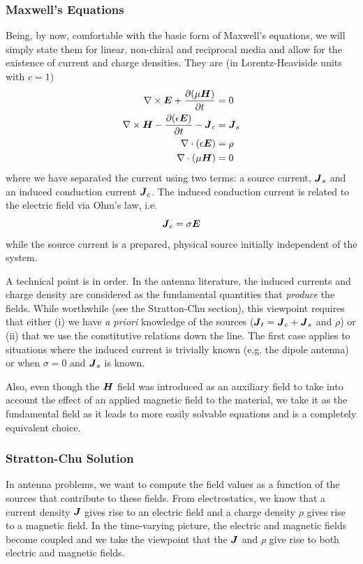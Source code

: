 \subsubsection{Maxwell's Equations}
Being, by now, comfortable with the basic form of Maxwell's equations, 
we will simply state them for linear, non-chiral and reciprocal media
and allow for the existence of current and charge densities. 
They are (in Lorentz-Heaviside units with $c=1$) \cite{NOV2012}
  \begin{subequations}
  \begin{align}
   \nabla\times\boldsymbol{E}+\frac{\partial(\mu\boldsymbol{H})}{\partial t}	&=0	\\
   \nabla\times\boldsymbol{H}-\frac{\partial(\epsilon\boldsymbol{E})}{\partial t}-\boldsymbol{J}_c&=\boldsymbol{J}_s\\
   \nabla\cdot(\epsilon\boldsymbol{E})					&=\rho	\\
   \nabla\cdot(\mu\boldsymbol{H})					&=0
  \end{align}
  \end{subequations}
where we have separated the current using two terms: a source current, $\boldsymbol{J}_s$ and
an induced conduction current $\boldsymbol{J}_c$. The induced conduction current
is related to the electric field via Ohm's law, i.e.
  \begin{equation}
   \boldsymbol{J}_c=\sigma\boldsymbol{E}
  \end{equation}
while the source current is a prepared, physical source initially 
independent of the system.

A technical point is in order. In the antenna literature, the induced
currents and charge density are considered as the fundamental quantities 
that \textit{produce} the fields. While worthwhile (see the Stratton-Chu section), 
this viewpoint requires that either (i) we have \textit{a priori} knowledge of 
the sources ($\boldsymbol{J}_t=\boldsymbol{J}_c+\boldsymbol{J}_s$ and $\rho$) or (ii) that we use the
constitutive relations down the line. The first case applies to situations
where the induced current is trivially known (e.g. the dipole antenna) or
when $\sigma=0$ and $\boldsymbol{J}_s$ is known.

Also, even though the $\boldsymbol{H}$ field was introduced as an auxiliary field to take
into account the effect of an applied magnetic field to the material, we 
take it as the fundamental field as it leads to more easily solvable
equations and is a completely equivalent choice. 

\subsubsection{Stratton-Chu Solution}
In antenna problems, we want to compute the field values as a function of 
the sources that contribute to these fields. From electrostatics, we know 
that a current density $\boldsymbol{J}$ gives rise to an electric field and a charge 
density $\rho$ gives rise to a magnetic field. In the time-varying picture, 
the electric and magnetic fields become coupled and we take the viewpoint that
the $\boldsymbol{J}$ and $\rho$ give rise to both electric and magnetic fields. 

